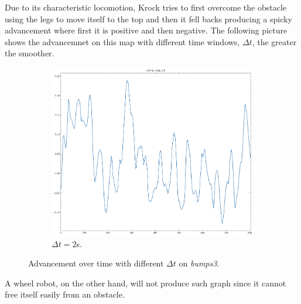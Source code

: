 \documentclass[../document.tex]{subfiles}
\begin{document}
Due to its characteristic locomotion, Krock tries to first overcome the obstacle using the legs to move itself to the top and then it fell backs producing a spicky advancement where first it is positive and then negative. The following picture shows the advancemnet on this map with different time windows, $\Delta t$, the greater the smoother.

\begin{figure}[H]
    \centering
    \begin{subfigure}[b]{0.45\textwidth}
        \includegraphics[width=\linewidth]{../img/3/find_tr/100-bumps3}
        \caption{$\Delta t = 2$s.}
    \end{subfigure}

\caption{Advancement over time with different $\Delta t$ on \emph{bumps3}.}
\end{figure}
A wheel robot, on the other hand, will not produce such graph since it cannot free itself easily from an obstacle.
\end{document}
